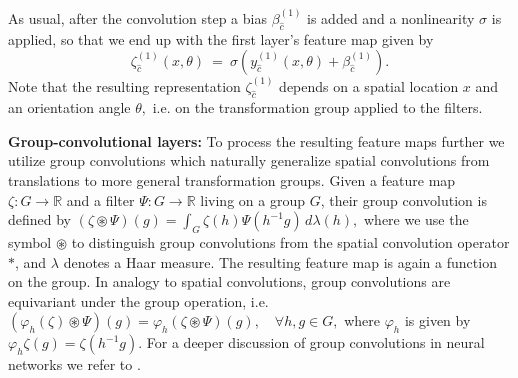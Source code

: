 \documentclass[10pt,twocolumn,letterpaper]{article}
\newcommand{\myparagraph}[1]{\vspace*{1ex}\noindent\textbf{#1}}
\begin{document}
As usual, after the convolution step a bias $\beta^{(1)}_{\hat{c}}$ is added and a nonlinearity $\sigma$ is applied, so that we end up with the first layer's feature map given by
\[
	\zeta^{(1)}_{\hat{c}}(x, \theta)\ =\ \sigma\left( y_{\hat{c}}^{(1)}(x,\theta) + \beta^{(1)}_{\hat{c}} \right).
\]
Note that the resulting representation $\zeta^{(1)}_{\hat{c}}$ depends on a spatial location $x$ and an orientation angle $\theta,$ i.e. on the transformation group applied to the filters.


\myparagraph{Group-convolutional layers:}
To process the resulting feature maps further we utilize group convolutions which naturally generalize spatial convolutions from translations to more general transformation groups.
Given a feature map $\zeta:G\to\mathbb{R}$ and a filter $\Psi:G\to\mathbb{R}$ living on a group $G$, their group convolution is defined by
$
	(\zeta \circledast \Psi)(g) = \int_{G} \zeta(h)\Psi(h^{-1}g) \, d\lambda(h),
$
where we use the symbol $\circledast$ to distinguish group convolutions from the spatial convolution operator $\ast$, and $\lambda$ denotes a Haar measure.
The resulting feature map is again a function on the group.
In analogy to spatial convolutions, group convolutions are equivariant under the group operation, i.e.
$
	\left(\varphi_h(\zeta) \circledast \Psi\right) (g) = \varphi_h \left(\zeta \circledast \Psi\right) (g), \quad \forall h, g \in G,
$
where  $\varphi_h$ is given by $\varphi_h \zeta(g) = \zeta(h^{-1}g).$
For a deeper discussion of group convolutions in neural networks we refer to \cite{cohen2016group}.
\end{document}
